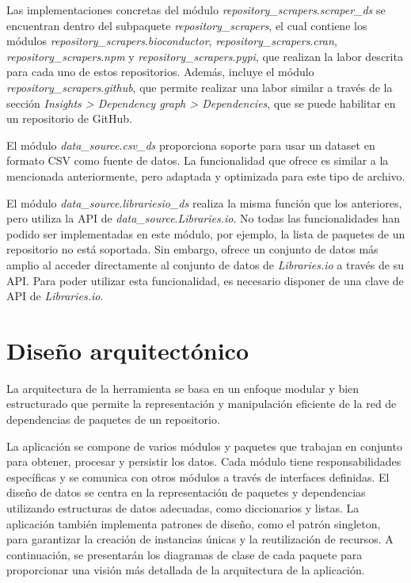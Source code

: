 Las implementaciones concretas del módulo \textit{repository\_scrapers}.\textit{scraper\_ds} se encuentran
dentro del subpaquete \textit{repository\_scrapers}, el cual contiene los módulos \textit{repository\_scrapers}.\textit{bioconductor},
\textit{repository\_scrapers}.\textit{cran}, \textit{repository\_scrapers}.\textit{npm}
y \textit{repository\_scrapers}.\textit{pypi}, que realizan la labor descrita para cada uno de
estos repositorios. Además, incluye el módulo \textit{repository\_scrapers}.\textit{github}, que permite
realizar una labor similar a través de la sección \textit{Insights > Dependency graph > Dependencies}, que se puede
habilitar en un repositorio de GitHub.

El módulo \textit{data\_source}.\textit{csv\_ds} proporciona soporte para usar un dataset en formato CSV como fuente de
datos. La funcionalidad que ofrece es similar a la mencionada anteriormente, pero adaptada y optimizada
para este tipo de archivo.

El módulo \textit{data\_source}.\textit{librariesio\_ds} realiza la misma función que los anteriores, pero utiliza la
API de \textit{data\_source}.\textit{Libraries.io}. No todas las funcionalidades han podido ser implementadas en este
módulo, por ejemplo, la lista de paquetes de un repositorio no está soportada. Sin embargo, ofrece
un conjunto de datos más amplio al acceder directamente al conjunto de datos de \textit{Libraries.io}
a través de su API. Para poder utilizar esta funcionalidad, es necesario disponer de una clave de API
de \textit{Libraries.io}.

\section{Diseño arquitectónico}

La arquitectura de la herramienta se basa en un enfoque modular y bien estructurado que permite la
representación y manipulación eficiente de la red de dependencias de paquetes de un repositorio. 

La aplicación se compone de varios módulos y paquetes que trabajan en conjunto para obtener, procesar y persistir los datos.
Cada módulo tiene responsabilidades específicas y se comunica con otros módulos a través de interfaces definidas.
El diseño de datos se centra en la representación de paquetes y dependencias utilizando estructuras de datos
adecuadas, como diccionarios y listas. La aplicación también implementa patrones de diseño, como el patrón singleton,
para garantizar la creación de instancias únicas y la reutilización de recursos. A continuación, se presentarán
los diagramas de clase de cada paquete para proporcionar una visión más detallada de la arquitectura de
la aplicación.


